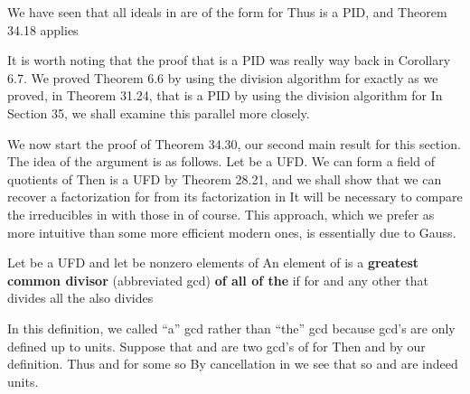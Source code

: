 \documentclass[11pt,oneside]{article}
\begin{document}
\begin{BookBody}

 We have seen that all ideals in  are of the form  for  Thus  is a PID, and Theorem 34.18 applies\BookEnd{\blacklozenge}

It is worth noting that the proof that  is a PID was really way back in Corollary 6.7. We proved Theorem 6.6 by using the division algorithm for  exactly as we proved, in Theorem 31.24, that  is a PID by using the division algorithm for  In Section 35, we shall examine this parallel more closely.


\noindent We now start the proof of Theorem 34.30, our second main result for this section. The idea of the argument is as follows. Let  be a UFD. We can form a field of quotients  of  Then  is a UFD by Theorem 28.21, and we shall show that we can recover a factorization for  from its factorization in  It will be necessary to compare the irreducibles in  with those in  of course. This approach, which we prefer as more intuitive than some more efficient modern ones, is essentially due to Gauss.

 Let  be a UFD and let  be nonzero elements of  An element  of  is a\textbf{ greatest common divisor} (abbreviated gcd)\textbf{ of all of the}  if  for  and any other  that divides all the  also divides \BookEnd{\blacksquare}

In this definition, we called  “a” gcd rather than “the” gcd because gcd’s are only defined up to units. Suppose that  and  are two gcd’s of  for  Then  and  by our definition. Thus  and  for some  so  By cancellation in  we see that  so  and  are indeed units.


\end{BookBody}
\end{document}
